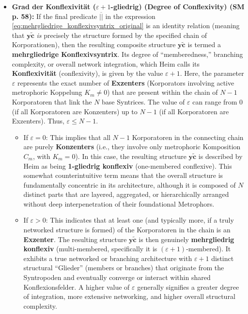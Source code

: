 \documentclass[12pt]{article}
\newcommand{\q}[1]{\enquote{#1}}
\newcommand{\konflexivsyntrix}{\bm{y\widetilde{c}}}
\begin{document}
\begin{itemize}
    \item \textbf{Grad der Konflexivität (\( \varepsilon+1 \)-gliedrig) (Degree of Conflexivity) (SM p. 58):}
    If the final predicate \( \overline{||} \) in the expression \eqref{eq:mehrgliedrige_konflexivsyntrix_original} is an identity relation (meaning that \( \konflexivsyntrix \) \textit{is} precisely the structure formed by the specified chain of Korporationen), then the resulting composite structure \( \konflexivsyntrix \) is termed a \textbf{mehrgliedrige Konflexivsyntrix}. Its degree of \q{memberedness,} branching complexity, or overall network integration, which Heim calls its \textbf{Konflexivität} (conflexivity), is given by the value \( \varepsilon+1 \). Here, the parameter \( \varepsilon \) represents the exact number of \textbf{Exzenters} (Korporators involving active metrophoric Koppelung \(K_m \neq 0\)) that are present within the chain of \( N-1 \) Korporatoren that link the \(N\) base Syntrices. The value of \( \varepsilon \) can range from \( 0 \) (if all Korporatoren are Konzenters) up to \( N-1 \) (if all Korporatoren are Exzenters). Thus, $\varepsilon \leq N-1$.
    \begin{itemize}
        \item If \( \varepsilon = 0 \): This implies that all \( N-1 \) Korporatoren in the connecting chain are purely \textbf{Konzenters} (i.e., they involve only metrophoric Komposition \(C_m\), with \(K_m=0\)). In this case, the resulting structure \( \konflexivsyntrix \) is described by Heim as being \textbf{1-gliedrig konflexiv} (one-membered conflexive). This somewhat counterintuitive term means that the overall structure is fundamentally concentric in its architecture, although it is composed of \( N \) distinct parts that are layered, aggregated, or hierarchically arranged without deep interpenetration of their foundational Metrophors.
        \item If \( \varepsilon > 0 \): This indicates that at least one (and typically more, if a truly networked structure is formed) of the Korporatoren in the chain is an \textbf{Exzenter}. The resulting structure \( \konflexivsyntrix \) is then genuinely \textbf{mehrgliedrig konflexiv} (multi-membered, specifically it is \( (\varepsilon+1) \)-membered). It exhibits a true networked or branching architecture with \( \varepsilon+1 \) distinct structural \q{Glieder} (members or branches) that originate from the Syntropoden and eventually converge or interact within shared Konflexionsfelder. A higher value of \( \varepsilon \) generally signifies a greater degree of integration, more extensive networking, and higher overall structural complexity.
    \end{itemize}


\end{itemize}
\end{document}
